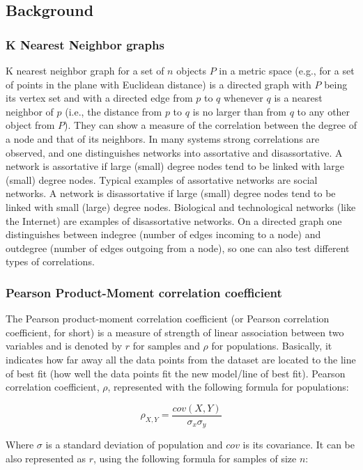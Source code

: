 \subsection{Background}
\subsubsection{K Nearest Neighbor graphs}
K nearest neighbor graph for a set of $n$ objects $P$ in a metric space (e.g., for a set of points in the plane with Euclidean distance) is a directed graph with $P$ being its vertex set and with a directed edge from $p$ to $q$ whenever $q$ is a nearest neighbor of $p$ (i.e., the distance from $p$ to $q$ is no larger than from $q$ to any other object from $P$).
They can show a measure of the correlation between the degree of a node and that of its neighbors.
In many systems strong correlations are observed, and one distinguishes networks into assortative and disassortative.
A network is assortative if large (small) degree nodes tend to be linked with large (small) degree nodes.
Typical examples of assortative networks are social networks.
A network is disassortative if large (small) degree nodes tend to be linked with small (large) degree nodes.
Biological and technological networks (like the Internet) are examples of disassortative networks.
On a directed graph one distinguishes between indegree (number of edges incoming to a node) and outdegree (number of edges outgoing from a node), so one can also test different types of correlations.

\subsubsection{Pearson Product-Moment correlation coefficient}

The Pearson product-moment correlation coefficient (or Pearson correlation coefficient, for short) is a measure of strength of linear association between two variables and is denoted by $r$ for samples and $\rho$ for populations.
Basically, it indicates how far away all the data points from the dataset are located to the line of best fit (how well the data points fit the new model/line of best fit).
Pearson correlation coefficient, $\rho$, represented with the following formula for populations:

$$ \rho_{X,Y} = \frac{cov(X,Y)}{\sigma_x \sigma_y}$$

Where $\sigma$ is a standard deviation of population and $cov$ is its covariance.
It can be also represented as $r$, using the following formula for samples of size $n$:

